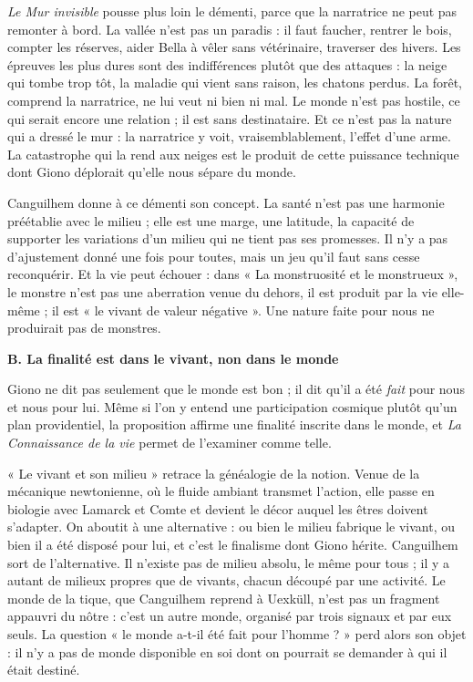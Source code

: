 \documentclass[11pt,a4paper]{article}
\begin{document}
\emph{Le Mur invisible} pousse plus loin le démenti, parce que la narratrice ne peut pas remonter à bord. La vallée n'est pas un paradis : il faut faucher, rentrer le bois, compter les réserves, aider Bella à vêler sans vétérinaire, traverser des hivers. Les épreuves les plus dures sont des indifférences plutôt que des attaques : la neige qui tombe trop tôt, la maladie qui vient sans raison, les chatons perdus. La forêt, comprend la narratrice, ne lui veut ni bien ni mal. Le monde n'est pas hostile, ce qui serait encore une relation ; il est sans destinataire. Et ce n'est pas la nature qui a dressé le mur : la narratrice y voit, vraisemblablement, l'effet d'une arme. La catastrophe qui la rend aux neiges est le produit de cette puissance technique dont Giono déplorait qu'elle nous sépare du monde.

Canguilhem donne à ce démenti son concept. La santé n'est pas une harmonie préétablie avec le milieu ; elle est une marge, une latitude, la capacité de supporter les variations d'un milieu qui ne tient pas ses promesses. Il n'y a pas d'ajustement donné une fois pour toutes, mais un jeu qu'il faut sans cesse reconquérir. Et la vie peut échouer : dans « La monstruosité et le monstrueux », le monstre n'est pas une aberration venue du dehors, il est produit par la vie elle-même ; il est « le vivant de valeur négative ». Une nature faite pour nous ne produirait pas de monstres.

\textbf{B. La finalité est dans le vivant, non dans le monde}

Giono ne dit pas seulement que le monde est bon ; il dit qu'il a été \emph{fait} pour nous et nous pour lui. Même si l'on y entend une participation cosmique plutôt qu'un plan providentiel, la proposition affirme une finalité inscrite dans le monde, et \emph{La Connaissance de la vie} permet de l'examiner comme telle.

« Le vivant et son milieu » retrace la généalogie de la notion. Venue de la mécanique newtonienne, où le fluide ambiant transmet l'action, elle passe en biologie avec Lamarck et Comte et devient le décor auquel les êtres doivent s'adapter. On aboutit à une alternative : ou bien le milieu fabrique le vivant, ou bien il a été disposé pour lui, et c'est le finalisme dont Giono hérite. Canguilhem sort de l'alternative. Il n'existe pas de milieu absolu, le même pour tous ; il y a autant de milieux propres que de vivants, chacun découpé par une activité. Le monde de la tique, que Canguilhem reprend à Uexküll, n'est pas un fragment appauvri du nôtre : c'est un autre monde, organisé par trois signaux et par eux seuls. La question « le monde a-t-il été fait pour l'homme ? » perd alors son objet : il n'y a pas de monde disponible en soi dont on pourrait se demander à qui il était destiné.
\end{document}
